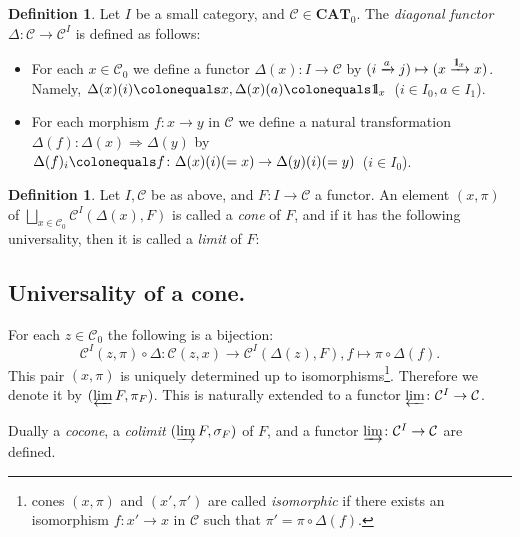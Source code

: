 \documentclass{surv-l}
\numberwithin{equation}{chapter}
\numberwithin{figure}{chapter}
\theoremstyle{plain}
\theoremstyle{definition}
\newtheorem{dfn}[thm]{Definition}
\theoremstyle{remark}
\newcommand{\id}{1\kern-.25em{\text{{\rm l}}}}
\begin{document}
\begin{dfn}
Let $I$ be a small category, and ${\mathcal{C}} \in \mathbf{CAT}_0$.
The \emph{diagonal functor} $\Delta \colon {\mathcal{C}} \to {\mathcal{C}}^I$ is defined as follows:
\begin{itemize}
\item
For each $x \in {\mathcal{C}}_0$ we define a functor $\Delta(x) \colon I \to {\mathcal{C}}$ by
$(i \xrightarrow{a} j) \mapsto (x \xrightarrow{\id_x} x)$.  Namely,
$\Delta(x)(i)\colonequals x, \Delta(x)(a)\colonequals  \id_x$\ ($i \in I_0, a \in I_1$).
\item
For each morphism $f \colon x \to y$ in ${\mathcal{C}}$ we define a natural transformation
$\Delta(f) \colon \Delta(x) \Rightarrow \Delta(y)$ by
$\Delta(f)_i\colonequals  f \colon \Delta(x)(i) (= x) \to \Delta(y)(i) (= y)$\ ($i \in I_0$).
\end{itemize}
\end{dfn}

\begin{dfn}
Let $I, {\mathcal{C}}$ be as above, and
$F \colon I \to {\mathcal{C}}$ a functor.
An element $(x, \pi)$ of $\bigsqcup_{x\in {\mathcal{C}}_0}{\mathcal{C}}^I(\Delta(x), F)$
is called a \emph{cone} of $F$, and if it has the following universality,
then it is called a \emph{limit} of $F$:

\subsection*{Universality of a cone.} For each $z \in {\mathcal{C}}_0$ the following is a bijection:
\begin{equation}\label{eq:univ-limit}
{\mathcal{C}}^I(z, \pi)\circ \Delta \colon {\mathcal{C}}(z, x) \to {\mathcal{C}}^I(\Delta(z), F),
f \mapsto \pi \circ \Delta(f).
\end{equation}
This pair $(x, \pi)$ is uniquely determined up to isomorphisms\footnote{cones $(x, \pi)$ and $(x', \pi')$ are called \emph{isomorphic} if
there exists an isomorphism $f\colon x' \to x$ in ${\mathcal{C}}$
such that $\pi' = \pi\circ \Delta(f)$.}.
Therefore we denote it by $(\varprojlim F, \pi_F)$.
This is naturally extended to a functor $\varprojlim \colon {\mathcal{C}}^I \to {\mathcal{C}}$.

Dually a \emph{cocone}, a \emph{colimit} $(\varinjlim F, \sigma_F)$ of $F$, and a functor
$\varinjlim \colon {\mathcal{C}}^I \to {\mathcal{C}}$ are defined.
\end{dfn}
\end{document}
